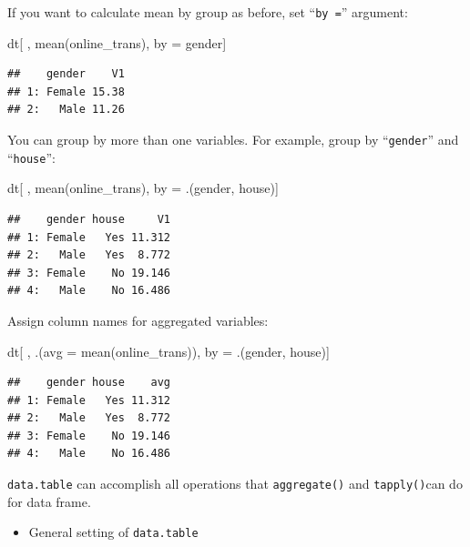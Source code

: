 \documentclass[
  12pt,
]{krantz}
\makeatletter
\newenvironment{Shaded}{\begin{snugshade}}{\end{snugshade}}
\newcommand{\AttributeTok}[1]{\textcolor[rgb]{0.61,0.61,0.61}{#1}}
\newcommand{\FunctionTok}[1]{\textcolor[rgb]{0,0,0}{#1}}
\newcommand{\NormalTok}[1]{#1}
\newcommand{\OtherTok}[1]{\textcolor[rgb]{0.37,0.37,0.37}{#1}}
\providecommand{\tightlist}{%
  \setlength{\itemsep}{0pt}\setlength{\parskip}{0pt}}
\newenvironment{kframe}{%
\medskip{}
\setlength{\fboxsep}{.8em}
 \def\at@end@of@kframe{}%
 \ifinner\ifhmode%
  \def\at@end@of@kframe{\end{minipage}}%
  \begin{minipage}{\columnwidth}%
 \fi\fi%
 \def\FrameCommand##1{\hskip\@totalleftmargin \hskip-\fboxsep
 \colorbox{shadecolor}{##1}\hskip-\fboxsep
     \hskip-\linewidth \hskip-\@totalleftmargin \hskip\columnwidth}%
 \MakeFramed {\advance\hsize-\width
   \@totalleftmargin\z@ \linewidth\hsize
   \@setminipage}}%
 {\par\unskip\endMakeFramed%
 \at@end@of@kframe}
\renewenvironment{Shaded}{\begin{kframe}}{\end{kframe}}
\makeatother
\begin{document}
If you want to calculate mean by group as before, set ``\texttt{by\ =}'' argument:

\begin{Shaded}
\begin{Highlighting}[]
\NormalTok{dt[ , }\FunctionTok{mean}\NormalTok{(online\_trans), by }\OtherTok{=}\NormalTok{ gender]}
\end{Highlighting}
\end{Shaded}

\begin{verbatim}
##    gender    V1
## 1: Female 15.38
## 2:   Male 11.26
\end{verbatim}

You can group by more than one variables. For example, group by ``\texttt{gender}'' and ``\texttt{house}'':

\begin{Shaded}
\begin{Highlighting}[]
\NormalTok{dt[ , }\FunctionTok{mean}\NormalTok{(online\_trans), by }\OtherTok{=}\NormalTok{ .(gender, house)]}
\end{Highlighting}
\end{Shaded}

\begin{verbatim}
##    gender house     V1
## 1: Female   Yes 11.312
## 2:   Male   Yes  8.772
## 3: Female    No 19.146
## 4:   Male    No 16.486
\end{verbatim}

Assign column names for aggregated variables:

\begin{Shaded}
\begin{Highlighting}[]
\NormalTok{dt[ , .(}\AttributeTok{avg =} \FunctionTok{mean}\NormalTok{(online\_trans)), by }\OtherTok{=}\NormalTok{ .(gender, house)]}
\end{Highlighting}
\end{Shaded}

\begin{verbatim}
##    gender house    avg
## 1: Female   Yes 11.312
## 2:   Male   Yes  8.772
## 3: Female    No 19.146
## 4:   Male    No 16.486
\end{verbatim}

\texttt{data.table} can accomplish all operations that \texttt{aggregate()} and \texttt{tapply()}can do for data frame.

\begin{itemize}
\tightlist
\item
  General setting of \texttt{data.table}
\end{itemize}
\end{document}
